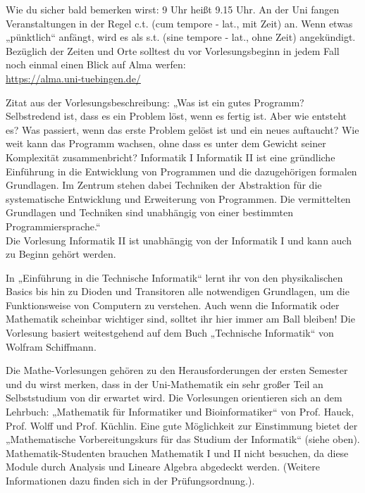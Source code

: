 
Wie du sicher bald bemerken wirst: 9 Uhr heißt 9.15 Uhr. An der Uni fangen Veranstaltungen in der Regel c.t. (cum
tempore - lat., mit Zeit) an. Wenn etwas „pünktlich“ anfängt, wird es als s.t. (sine tempore - lat., ohne
Zeit) angekündigt.
Bezüglich der Zeiten und Orte solltest du vor Vorlesungsbeginn in jedem Fall noch einmal einen Blick auf Alma werfen:\\
\url{https://alma.uni-tuebingen.de/}

\ifbachelor
{}
Zitat aus der Vorlesungsbeschreibung: „Was ist ein gutes Programm? Selbstredend ist, dass es ein
Problem löst, wenn es fertig ist. Aber wie entsteht es? Was passiert, wenn das erste Problem gelöst
ist und ein neues auftaucht? Wie weit kann das Programm wachsen, ohne dass es unter dem Gewicht
seiner Komplexität zusammenbricht? 
\ifwintersemester
Informatik I 
\fi
\ifsommersemester
Informatik II
\fi 
ist eine gründliche Einführung in die Entwicklung
von Programmen und die dazugehörigen formalen Grundlagen. Im Zentrum stehen dabei Techniken der Abstraktion
für die systematische Entwicklung und Erweiterung von Programmen. Die vermittelten Grundlagen und Techniken
sind unabhängig von einer bestimmten Programmiersprache.“\\
\ifsommersemester
Die Vorlesung Informatik II ist unabhängig von der Informatik I und kann auch zu Beginn gehört werden.
\fi

\ifinfo
\ifwintersemester
{}
In „Einführung in die Technische Informatik“ lernt ihr von den physikalischen Basics bis hin zu Dioden und Transitoren alle notwendigen Grundlagen, um die Funktionsweise von Computern zu verstehen. Auch wenn die Informatik oder Mathematik scheinbar wichtiger sind, solltet ihr hier immer am Ball bleiben! Die Vorlesung basiert weitestgehend auf dem Buch „Technische Informatik“ von Wolfram Schiffmann.
\fi
\fi

Die Mathe-Vorlesungen gehören zu den Herausforderungen der ersten Semester und du wirst merken, dass in der Uni-Mathematik ein sehr großer Teil an Selbststudium von dir erwartet wird. Die Vorlesungen orientieren sich an dem Lehrbuch: „Mathematik für Informatiker und Bioinformatiker“ von Prof. Hauck, Prof. Wolff und Prof. Küchlin. Eine gute Möglichkeit zur Einstimmung bietet der „Mathematische Vorbereitungskurs für das Studium der Informatik“ (siehe oben). 
\iflehramt
Mathematik-Studenten brauchen Mathematik I
und II nicht besuchen, da diese Module durch Analysis und Lineare Algebra
abgedeckt werden. (Weitere Informationen dazu finden sich in der
Prüfungsordnung.).
\fi
\fi
